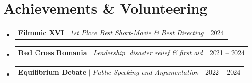 \documentclass[letterpaper,11pt]{article}
\makeatletter
\newcommand{\resumeProjectHeading}[2]{
    \item
    \begin{tabular*}{0.97\textwidth}{l@{\extracolsep{\fill}}r}
      \small#1 & #2 \\
    \end{tabular*}\vspace{-7pt}
}
\newcommand{\resumeSubHeadingListStart}{\begin{itemize}[leftmargin=0.15in, label={}]}
\newcommand{\resumeSubHeadingListEnd}{\end{itemize}}
\makeatother
\begin{document}
\section{Achievements \& Volunteering}
  \resumeSubHeadingListStart
    \resumeProjectHeading
      {\textbf{Filmmic XVI} $|$ \emph{1st Place Best Short-Movie \& Best Directing}}{2024}
    \resumeProjectHeading
      {\textbf{Red Cross Romania} $|$ \emph{Leadership, disaster relief \& first aid}}{2021 -- 2024}
    \resumeProjectHeading
      {\textbf{Equilibrium Debate} $|$ \emph{Public Speaking and Argumentation}}{2022 -- 2024}
  \resumeSubHeadingListEnd

\end{document}

